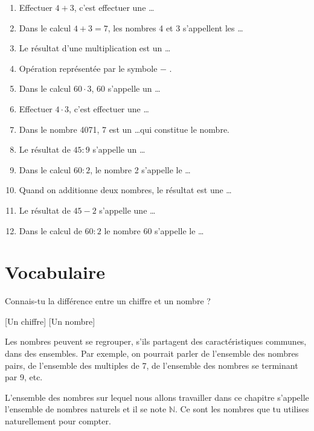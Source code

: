 \documentclass[../../syllabus_1.tex]{subfiles}
\begin{document}
\begin{enumerate}[cols=2, label=\textbf{\arabic*.}]
    \item Effectuer $4 + 3$, c'est effectuer une \dots
    \item Dans le calcul $4 + 3 = 7$, les nombres 4 et 3 s'appellent les \dots
    \item Le résultat d'une multiplication est un \dots
    \item Opération représentée par le symbole \og $-$ \fg.
    \item Dans le calcul $60 \cdot 3$, 60 s'appelle un \dots
    \item Effectuer $4 \cdot 3$, c'est effectuer une \dots
    \item Dans le nombre \num{4071}, 7 est un \dots qui constitue le nombre.
    \item Le résultat de $45 : 9$ s'appelle un \dots
    \item Dans le calcul $60 : 2$, le nombre 2 s'appelle le \dots
    \item Quand on additionne deux nombres, le résultat est une \dots
    \item Le résultat de $45 - 2 $ s'appelle une \dots
    \item Dans le calcul de $60 : 2$ le nombre 60 s'appelle le \dots
\end{enumerate}

\newpage
\section{Vocabulaire}
Connais-tu la différence entre un chiffre et un nombre ?

[Un chiffre]
[Un nombre]



Les nombres peuvent se regrouper, s'ils partagent des caractéristiques communes, dans des ensembles. Par exemple, on pourrait parler de l'ensemble des nombres pairs, de l'ensemble des multiples de 7, de l'ensemble des nombres se terminant par 9, etc.

L'ensemble des nombres sur lequel nous allons travailler dans ce chapitre s'appelle l'ensemble de nombres naturels et il se note $\mathbb{N}$. Ce sont les nombres que tu utilises naturellement pour compter.
\end{document}

